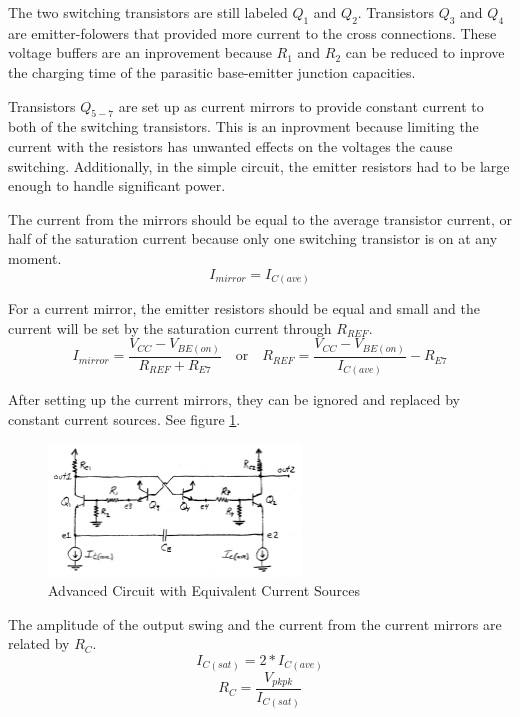 \documentclass[titlepage, letterpaper, 10.5pt]{article}
\begin{document}
The two switching transistors are still labeled $Q_{1}$ and $Q_{2}$.
Transistors $Q_{3}$ and $Q_{4}$ are emitter-folowers that provided more current
to the cross connections.
These voltage buffers are an inprovement because $R_{1}$ and $R_{2}$ can be reduced
to inprove the charging time of the parasitic base-emitter junction capacities.

Transistors $Q_{5-7}$ are set up as current mirrors to provide constant current
to both of the switching transistors. This is an inprovment because limiting the
current with the resistors has unwanted effects on the voltages the cause switching.
Additionally, in the simple circuit, the emitter resistors had to be large enough
to handle significant power.

The current from the mirrors
should be equal to the average transistor current, or half of the
saturation current because only one switching transistor is on at any moment.
\begin{equation*}
I_{mirror}=I_{C(ave)}
\end{equation*}

For a current mirror, the emitter resistors should be equal and small and
the current will be set by the saturation current through $R_{REF}$.
\begin{equation}
I_{mirror}=\frac{V_{CC}-V_{BE(on)}}{R_{REF}+R_{E7}}
\quad \textrm{or} \quad
R_{REF}=\frac{V_{CC}-V_{BE(on)}}{I_{C(ave)}}-R_{E7}
\label{advanced-rref-eq}
\end{equation}

After setting up the current mirrors, they can be ignored and replaced
by constant current sources. See figure \ref{advanced-circuit-without-mirrors}.

\begin{figure}[ht]
	\centering
	\includegraphics[width=0.6\textwidth]{diagrams/advanced-circuit-without-mirrors}
	\caption{Advanced Circuit with Equivalent Current Sources}
	\label{advanced-circuit-without-mirrors}
\end{figure}

The amplitude of the output swing and the current from the current mirrors are related by $R_{C}$.
\begin{equation}
I_{C(sat)}=2*I_{C(ave)}
\end{equation}
\begin{equation}
R_{C}=\frac{V_{pkpk}}{I_{C(sat)}}
\label{advanced-rc-eq}
\end{equation}
\end{document}
